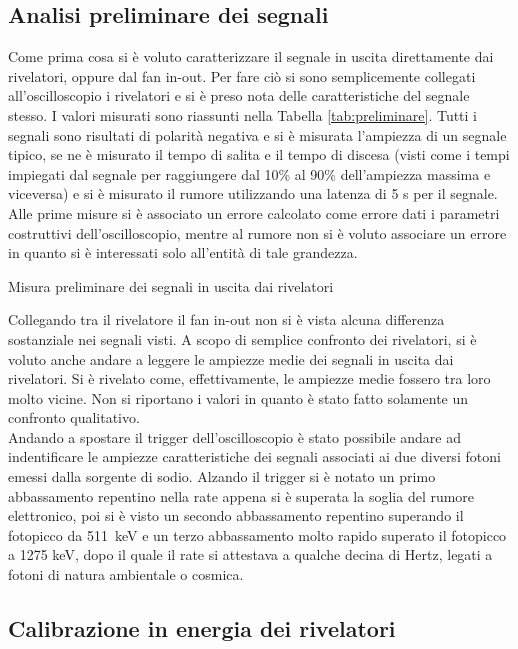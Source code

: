 \subsection{Analisi preliminare dei segnali}

Come prima cosa si è voluto caratterizzare il segnale in uscita direttamente dai rivelatori, oppure dal fan in-out. Per fare ciò si sono semplicemente collegati
all'oscilloscopio i rivelatori e si è preso nota delle caratteristiche del segnale stesso. I valori misurati sono riassunti nella Tabella \ref{tab:preliminare}.
Tutti i segnali sono risultati
di polarità negativa e si è misurata l'ampiezza di un segnale tipico, se ne è misurato il tempo di salita e il tempo di discesa (visti come i tempi impiegati dal segnale
per raggiungere dal 10\% al 90\% dell'ampiezza massima e viceversa) e si è misurato il rumore utilizzando una latenza di 5 s per il segnale. Alle prime misure si è
associato un errore calcolato come errore dati i parametri costruttivi dell'oscilloscopio, mentre al rumore non si è voluto associare un errore in quanto si è interessati
solo all'entità di tale grandezza.
%
\begin{table}[h]
	\centering
	
	\caption{Misura preliminare dei segnali in uscita dai rivelatori}
	\label{tab:preliminare}
\end{table}
%
Collegando tra il rivelatore il fan in-out non si è vista alcuna differenza sostanziale nei segnali visti.
A scopo di semplice confronto dei rivelatori, si è voluto anche andare a leggere le ampiezze medie dei segnali in uscita dai rivelatori. Si è rivelato come, effettivamente, 
le ampiezze medie fossero tra loro molto vicine. Non si riportano i valori in quanto è stato fatto solamente un confronto qualitativo.\\

Andando a spostare il trigger dell'oscilloscopio è stato possibile andare ad indentificare le ampiezze caratteristiche dei segnali associati ai due diversi fotoni emessi dalla
sorgente di sodio. Alzando il trigger si è notato un primo abbassamento repentino nella rate appena si è superata la soglia del rumore elettronico, poi si è visto
un secondo abbassamento repentino superando il fotopicco da 511~keV e un terzo abbassamento molto rapido superato il fotopicco a 1275 keV, dopo il quale il rate si attestava
a qualche decina di Hertz, legati a fotoni di natura ambientale o cosmica.\\

\subsection{Calibrazione in energia dei rivelatori}

